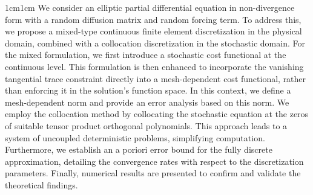		\begin{center}
			\begin{adjustwidth}{1cm}{1cm} %
				\noindent
				{\fontsize{6pt}{1pt}\selectfont{BSTRACT.}}\quad
				\footnotesize
			We consider an elliptic partial differential equation in non-divergence form with a random diffusion matrix and random forcing term.
			To address this, we propose a mixed-type continuous finite element discretization in the physical domain, combined with a collocation discretization in the stochastic domain.
			For the mixed formulation, we first introduce a stochastic cost functional at the continuous level. This formulation is then enhanced to incorporate the vanishing tangential trace constraint directly into a mesh-dependent cost functional, rather than enforcing it in the solution’s function space. In this context, we define a mesh-dependent norm and provide an error analysis based on this norm.
			We employ the collocation method by collocating the stochastic equation at the zeros of suitable tensor product orthogonal polynomials. This approach leads to a system of uncoupled deterministic problems, simplifying computation.
			Furthermore, we establish an a poriori error bound for the fully discrete approximation, detailing the convergence rates with respect to the discretization parameters. Finally, numerical results are presented to confirm and validate the theoretical findings.
		\end{adjustwidth}
	\end{center}
		
%		
